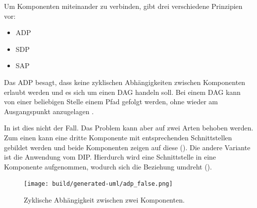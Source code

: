 


Um Komponenten miteinander zu verbinden, gibt  drei verschiedene Prinzipien vor:
\begin{itemize}
\item \ac{ADP}
\item \ac{SDP}
\item \ac{SAP}
\end{itemize}

Das \ac{ADP} besagt, dass keine zyklischen Abhängigkeiten zwischen Komponenten erlaubt werden und es sich um einen \ac{DAG} handeln soll. Bei einem \ac{DAG} kann von einer beliebigen Stelle einem Pfad gefolgt werden, ohne wieder am Ausgangspunkt anzugelagen \citep[vgl.][114]{martin2018}. 

In  ist dies nicht der Fall. Das Problem kann aber auf zwei Arten behoben werden. Zum einen kann eine dritte Komponente mit entsprechenden Schnittstellen gebildet werden und beide Komponenten zeigen auf diese  (). Die andere Variante ist die Anwendung vom \ac{DIP}. Hierdurch wird eine Schnittstelle in eine Komponente aufgenommen, wodurch sich die Beziehung umdreht ().

\begin{figure}
  \centering
  \texttt{[image: build/generated-uml/adp\_false.png]}
   \caption{Zyklische Abhängigkeit zwischen zwei Komponenten.}
   \label{fig:adp_false}
\end{figure}

